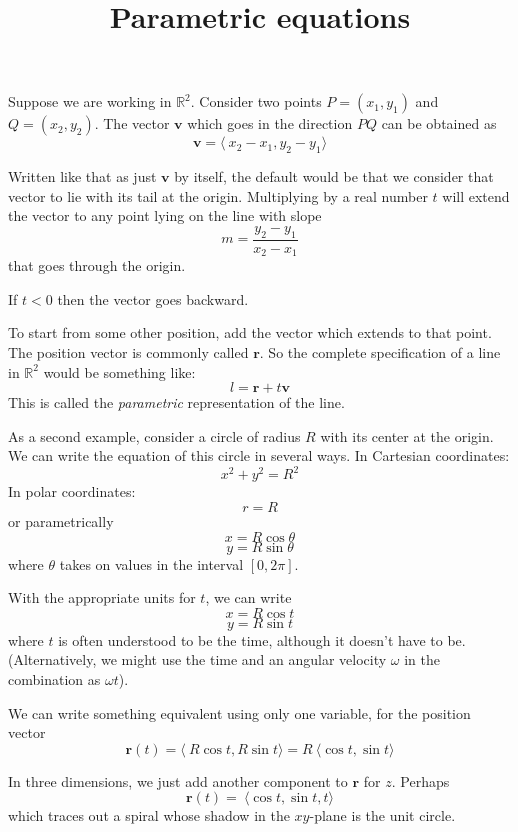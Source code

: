 \documentclass[11pt, oneside]{article}
\title{Parametric equations}
\date{}
\begin{document}
\maketitle
\Large


\label{sec:Parametric_equations}

Suppose we are working in $\mathbb{R}^2$.  Consider two points $P = (x_1,y_1)$ and $Q = (x_2, y_2)$.  The vector $\mathbf{v}$ which goes in the direction $PQ$ can be obtained as
\[ \mathbf{v} = \langle \ x_2 - x_1, y_2 - y_1 \rangle \]

Written like that as just $\mathbf{v}$ by itself, the default would be that we consider that vector to lie with its tail at the origin.  Multiplying by a real number $t$ will extend the vector to any point lying on the line with slope
\[ m = \frac{y_2 - y_1}{x_2 - x_1} \]
that goes through the origin.  

If $t < 0$ then the vector goes backward.

To start from some other position, add the vector which extends to that point.  The position vector is commonly called $\mathbf{r}$.  So the complete specification of a line in $\mathbb{R}^2$ would be something like:
\[ l = \mathbf{r} + t \mathbf{v} \]
This is called the \emph{parametric} representation of the line.

As a second example, consider a circle of radius $R$ with its center at the origin.  We can write the equation of this circle in several ways.  In Cartesian coordinates:
\[ x^2 + y^2 = R^2 \]
In polar coordinates:
\[ r = R \]
or parametrically
\[ x = R \cos \theta \]
\[ y = R \sin \theta \]
where $\theta$ takes on values in the interval $[0, 2\pi]$.

With the appropriate units for $t$, we can write
\[ x = R \cos t \]
\[ y = R \sin t \]
where $t$ is often understood to be the time, although it doesn't have to be.  (Alternatively, we might use the time and an angular velocity $\omega$ in the combination as $\omega t$).

We can write something equivalent using only one variable, for the position vector
\[ \mathbf{r}(t) = \langle \ R \cos t, R \sin t \rangle = R \ \langle \cos t, \sin t \rangle  \]

In three dimensions, we just add another component to $\mathbf{r}$ for $z$.  Perhaps
\[ \mathbf{r}(t) =  \ \langle \cos t, \sin t, t  \rangle  \]
which traces out a spiral whose shadow in the $xy$-plane is the unit circle.
\end{document}
